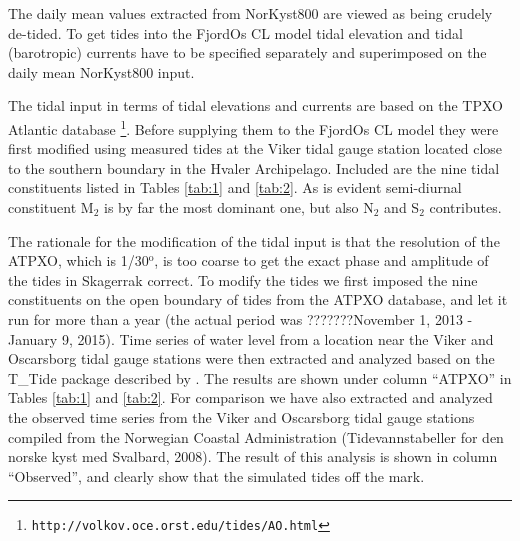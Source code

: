 The daily mean values extracted from NorKyst800 are viewed as being crudely de-tided. To get tides into the FjordOs CL model tidal elevation and tidal (barotropic) currents have to be specified separately and superimposed on the daily mean NorKyst800 input. 

The tidal input in terms of tidal elevations and currents are based on the TPXO Atlantic database \citep[][hereafter ATPXO]{egber:erofe:2002}\footnote{\texttt{http://volkov.oce.orst.edu/tides/AO.html}}. Before supplying them to the FjordOs CL model they were first modified using measured tides at the Viker tidal gauge station located close to the southern boundary in the Hvaler Archipelago. Included are the nine tidal constituents listed in Tables \ref{tab:1} and \ref{tab:2}. As is evident semi-diurnal constituent M$_2$ is by far the most dominant one, but also N$_2$ and S$_2$ contributes. 


The rationale for the modification of the tidal input is that the resolution of the ATPXO, which is 1/30$^{\textrm{o}}$, is too coarse to get the exact phase and amplitude of the tides in Skagerrak correct. To modify the tides we first imposed the nine constituents on the open boundary of tides from the ATPXO database, and let it run for more than a year (the actual period was ???????November 1, 2013 - January 9, 2015). Time series of water level from a location near the Viker and Oscarsborg tidal gauge stations were then extracted and analyzed based on the T\_Tide package described by \cite{pavlo:etal:2002}. The results are shown under column ``ATPXO'' in Tables \ref{tab:1} and \ref{tab:2}. For comparison we have also extracted and analyzed the observed time series from the Viker and Oscarsborg tidal gauge stations compiled from the Norwegian Coastal Administration (Tidevannstabeller for den norske kyst med Svalbard, 2008). The result of this analysis is shown in column ``Observed'', and clearly show that the simulated tides off the mark.  


